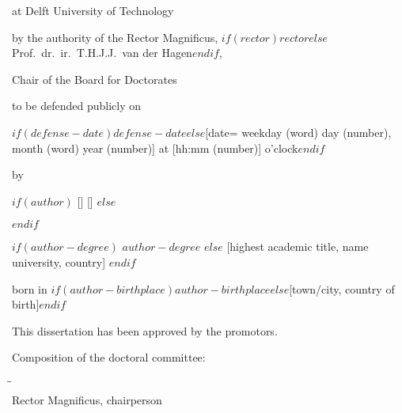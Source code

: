 \begin{titlepage}
\begin{center}
        at Delft University of Technology

        by the authority of the Rector Magnificus, $if(rector)$$rector$$else$Prof.~dr.~ir.~T.H.J.J.~van der Hagen$endif$,

        Chair of the Board for Doctorates

        to be defended publicly on

        $if(defense-date)$$defense-date$$else$[date= weekday (word) day (number), month (word) year (number)] at [hh:mm (number)] o'clock$endif$

        \bigskip
        \bigskip

        by

        \bigskip
        \bigskip

        $if(author)$
            \newcommand{\formatname}[2]{#1 \MakeUppercase{#2}} %
            [\FirstName]
            [\LastName]
            {\Large\titlefont\bfseries \formatname{\FirstName}{\LastName}}
        $else$
            \author{$for(authors)$$it.name.literal$$sep$ \and $endfor$}
        $endif$

        \bigskip
        \bigskip

        $if(author-degree)$
        $author-degree$
        $else$
        [highest academic title, name university, country]
        $endif$

        born in $if(author-birthplace)$$author-birthplace$$else$[town/city, country of birth]$endif$

        \vspace*{2\bigskipamount}

    \end{center}

    \clearpage
    \thispagestyle{empty}

    \noindent This dissertation has been approved by the promotors.

    \bigskip
    \noindent Composition of the doctoral committee:
    \begin{tabbing}
        \hspace{\tabcolsep}\=\hspace{0.33\textwidth}\=\hspace{0.66\textwidth}                   \\[-3\medskipamount]
        \> Rector Magnificus,          \> chairperson\\


\end{tabbing}
\end{titlepage}
